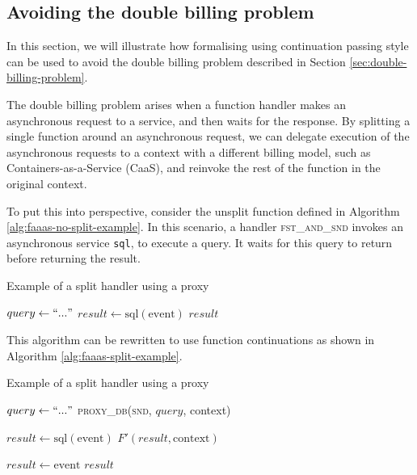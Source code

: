 \subsection{Avoiding the double billing problem}
In this section, we will illustrate how formalising \faas{} using continuation passing style can be used to avoid the double billing problem described in Section \ref{sec:double-billing-problem}.

The double billing problem arises when a function handler makes an asynchronous request to a service, and then waits for the response. By splitting a single function around an asynchronous request, we can delegate execution of the asynchronous requests to a context with a different billing model, such as Containers-as-a-Service (CaaS), and reinvoke the rest of the function in the original \faas{} context.

To put this into perspective, consider the unsplit function defined in Algorithm \ref{alg:faaas-no-split-example}. In this scenario, a handler \textsc{fst_and_snd} invokes an asynchronous service \verb|sql|, to execute a query. It waits for this query to return before returning the result.

\begin{algorithm}
\caption{Example of a split handler using a proxy}
\label{alg:faaas-no-split-example}
\begin{algorithmic}[1]
    \State $query \gets ``..."$
    \State $result \gets \textrm{sql}(\textrm{event})$
    \State \Return $result$
\EndFunction
\end{algorithmic}
\end{algorithm}

This algorithm can be rewritten to use function continuations as shown in Algorithm \ref{alg:faaas-split-example}.

\begin{algorithm}
\caption{Example of a split handler using a proxy}
\label{alg:faaas-split-example}
\begin{algorithmic}[1]
    \State $query \gets ``..."$
    \State \Return \textsc{proxy_db}(\textsc{snd}, $query$, context)
\EndFunction

    \State $result \gets \textrm{sql}(\textrm{event})$
    \State \Return $F'(result, \textrm{context})$
\EndFunction

    \State $result \gets \textrm{event}$
    \State \Return $result$
\EndFunction
\end{algorithmic}
\end{algorithm}

